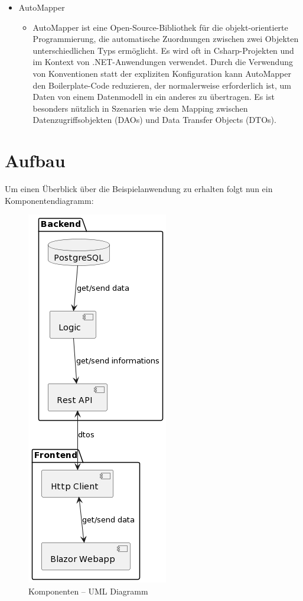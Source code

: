 \begin{itemize}
    \item AutoMapper
    \begin{itemize}
        \item AutoMapper ist eine Open-Source-Bibliothek für die objekt-orientierte Programmierung, die automatische Zuordnungen zwischen zwei Objekten unterschiedlichen Typs ermöglicht. Es wird oft in Csharp-Projekten und im Kontext von .NET-Anwendungen verwendet. Durch die Verwendung von Konventionen statt der expliziten Konfiguration kann AutoMapper den Boilerplate-Code reduzieren, der normalerweise erforderlich ist, um Daten von einem Datenmodell in ein anderes zu übertragen. Es ist besonders nützlich in Szenarien wie dem Mapping zwischen Datenzugriffsobjekten (DAOs) und Data Transfer Objects (DTOs).
    \end{itemize}
\end{itemize} 

\newpage
\section{Aufbau}

Um einen Überblick über die Beispielanwendung zu erhalten folgt nun ein Komponentendiagramm:

\begin{figure}[H]
    \centering
    \includegraphics[scale=0.5]{pics/KomponentenDiagramm.png}
    \caption{Komponenten -- UML Diagramm}
    \label{fig:impl:KomponentenDiagramm}
\end{figure}

